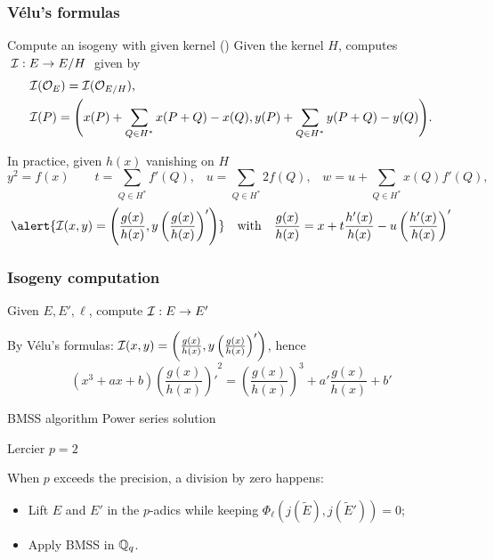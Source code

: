 \documentclass[10pt,usepdftitle=false]{beamer}
\begin{document}
\begin{frame}
  \frametitle{Vélu's formulas}
  
  \begin{block}{Compute an isogeny with given kernel (\cite{velu71})}
    Given the kernel $H$, computes $\;\mathcal{I} : E\to E/H\;$ given by
    \begin{align*}
      &\mathcal{I}(\mathcal{O}_E) = \mathcal{I}(\mathcal{O}_{E/H})\text{,}\\
      &\begin{aligned}
        \mathcal{I}(P) = \Biggl(x(P) + \sum_{Q\in H^\ast}x(P+Q) - x(Q),
        y(P) + \sum_{Q\in H^\ast}y(P+Q) - y(Q) \Biggr) \text{.}
      \end{aligned}
    \end{align*}
  \end{block}

  \begin{block}{In practice, given $h(x)$ vanishing on $H$}
    {\footnotesize
      \[
      y^2 = f(x)
      \qquad
      t = \sum_{Q\in H^\ast} f'(Q)\text{,}
      \quad
      u = \sum_{Q\in H^\ast} 2f(Q)\text{,}
      \quad
      w = u + \sum_{Q\in H^\ast} x(Q)f'(Q)\text{,}\]}
    \[\alert{\I(x,y) = \left(\frac{g(x)}{h(x)}, y\left(\frac{g(x)}{h(x)}\right)'\right)}
    \quad\text{with}\quad
    \frac{g(x)}{h(x)} = x + t\frac{h'(x)}{h(x)} - u\left(\frac{h'(x)}{h(x)}\right)'\]
  \end{block}
\end{frame}


\begin{frame}
  \frametitle{Isogeny computation}
  
  \begin{center}
    \large
    Given $E, E', \ell$, compute $\mathcal{I}:E\to E'$
  \end{center}

  By Vélu's formulas:
  $\mathcal{I}(x,y) = \left(\frac{g(x)}{h(x)}, y\left(\frac{g(x)}{h(x)}\right)'\right)$,
  hence
  \[(x^3 + ax + b){\left(\frac{g(x)}{h(x)}\right)'}^2 =
  \left(\frac{g(x)}{h(x)}\right)^3 + a'\frac{g(x)}{h(x)} + b'\]
  
  \begin{block}{BMSS algorithm \parencite{bostan+morain+salvy+schost08}}
    Power series solution 
  \end{block}

  \begin{block}{Lercier $p=2$}
    
  \end{block}

  \begin{block}{\cite{lercier+sirvent08}}
    When $p$ exceeds the precision, a division by zero happens:
    \begin{itemize}
    \item Lift $E$ and $E'$ in the $p$-adics while keeping $\Phi_\ell\left(j(\tilde{E}),j(\tilde{E}')\right)=0$;
    \item Apply BMSS in $\mathbb{Q}_q$.
    \end{itemize}
  \end{block}
\end{frame}
\end{document}
